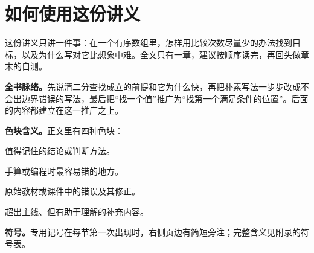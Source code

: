 \chapter*{如何使用这份讲义}
这份讲义只讲一件事：在一个有序数组里，怎样用比较次数尽量少的办法找到目标，以及为什么写对它比想象中难。全文只有一章，建议按顺序读完，再回头做章末的自测。

\textbf{全书脉络。}先说清二分查找成立的前提和它为什么快，再把朴素写法一步步改成不会出边界错误的写法，最后把``找一个值''推广为``找第一个满足条件的位置''。后面的内容都建立在这一推广之上。

\textbf{色块含义。}正文里有四种色块：
\begin{keypoint}值得记住的结论或判断方法。\end{keypoint}
\begin{pitfall}手算或编程时最容易错的地方。\end{pitfall}
\begin{errata}原始教材或课件中的错误及其修正。\end{errata}
\begin{supp}超出主线、但有助于理解的补充内容。\end{supp}

\textbf{符号。}专用记号在每节第一次出现时，右侧页边有简短旁注；完整含义见附录的符号表。
